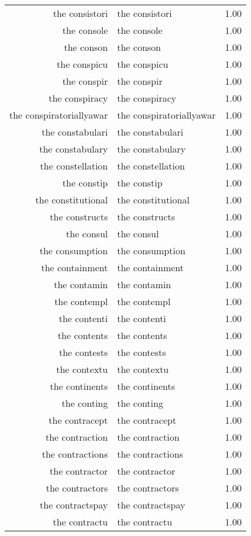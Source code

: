 \begin{table}[ht]
\begin{tabular}{rlr}
  the consistori & the consistori & 1.00 \\ 
  the console & the console & 1.00 \\ 
  the conson & the conson & 1.00 \\ 
  the conspicu & the conspicu & 1.00 \\ 
  the conspir & the conspir & 1.00 \\ 
  the conspiracy & the conspiracy & 1.00 \\ 
  the conspiratoriallyawar & the conspiratoriallyawar & 1.00 \\ 
  the constabulari & the constabulari & 1.00 \\ 
  the constabulary & the constabulary & 1.00 \\ 
  the constellation & the constellation & 1.00 \\ 
  the constip & the constip & 1.00 \\ 
  the constitutional & the constitutional & 1.00 \\ 
  the constructs & the constructs & 1.00 \\ 
  the consul & the consul & 1.00 \\ 
  the consumption & the consumption & 1.00 \\ 
  the containment & the containment & 1.00 \\ 
  the contamin & the contamin & 1.00 \\ 
  the contempl & the contempl & 1.00 \\ 
  the contenti & the contenti & 1.00 \\ 
  the contents & the contents & 1.00 \\ 
  the contests & the contests & 1.00 \\ 
  the contextu & the contextu & 1.00 \\ 
  the continents & the continents & 1.00 \\ 
  the conting & the conting & 1.00 \\ 
  the contracept & the contracept & 1.00 \\ 
  the contraction & the contraction & 1.00 \\ 
  the contractions & the contractions & 1.00 \\ 
  the contractor & the contractor & 1.00 \\ 
  the contractors & the contractors & 1.00 \\ 
  the contractspay & the contractspay & 1.00 \\ 
  the contractu & the contractu & 1.00 \\ 

\end{tabular}
\end{table}
